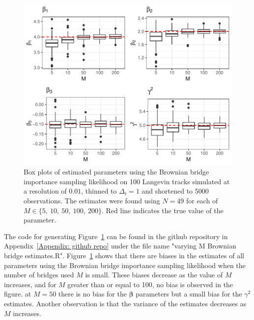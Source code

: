 \begin{figure}[H]
    \centering
    \includegraphics[width=\linewidth]{Images/Results/varying M estimates boxplot BB.pdf}
    \caption[Box plots of Parameter Estimates using Brownian bridge importance sampling using different numbers of bridges]{Box plots of estimated parameters using the Brownian bridge importance sampling likelihood on 100 Langevin tracks simulated at a resolution of $0.01$, thinned to $\Delta_t = 1$ and shortened to 5000 observations. The estimates were found using $N=49$ for each of $M \in \{5 , \ 10, \ 50, \ 100, \ 200\}$. Red line indicates the true value of the parameter.}
    \label{fig:varying M boxplots brownian bridge}
\end{figure}

The code for generating Figure~\ref{fig:varying M boxplots brownian bridge} can be found in the github repository in Appendix~\ref{Appendix: github repo} under the file name "varying M Brownian bridge estimates.R". Figure~\ref{fig:varying M boxplots brownian bridge} shows that there are biases in the estimates of all parameters using the Brownian bridge importance sampling likelihood when the number of bridges used $M$ is small. These biases decrease as the value of $M$ increases, and for $M$ greater than or equal to 100, no bias is observed in the figure. at $M =50$ there is no bias for the $\bm \beta$ parameters but a small bias for the $\gamma^2$ estimates. Another observation is that the variance of the estimates decreases as $M$ increases.



